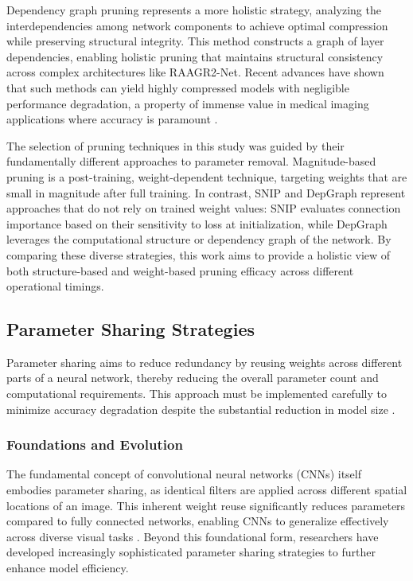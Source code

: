 \documentclass[12pt,a4paper]{article}
\begin{document}
Dependency graph pruning represents a more holistic strategy, analyzing the interdependencies among network components to achieve optimal compression while preserving structural integrity. This method constructs a graph of layer dependencies, enabling holistic pruning that maintains structural consistency across complex architectures like RAAGR2-Net. Recent advances have shown that such methods can yield highly compressed models with negligible performance degradation, a property of immense value in medical imaging applications where accuracy is paramount \cite{Mazurek2024, Ragab2024}.

The selection of pruning techniques in this study was guided by their fundamentally different approaches to parameter removal. Magnitude-based pruning is a post-training, weight-dependent technique, targeting weights that are small in magnitude after full training. In contrast, SNIP and DepGraph represent approaches that do not rely on trained weight values: SNIP evaluates connection importance based on their sensitivity to loss at initialization, while DepGraph leverages the computational structure or dependency graph of the network. By comparing these diverse strategies, this work aims to provide a holistic view of both structure-based and weight-based pruning efficacy across different operational timings.

\subsection{Parameter Sharing Strategies}

Parameter sharing aims to reduce redundancy by reusing weights across different parts of a neural network, thereby reducing the overall parameter count and computational requirements. This approach must be implemented carefully to minimize accuracy degradation despite the substantial reduction in model size \cite{desai2024}.

\subsubsection{Foundations and Evolution}

The fundamental concept of convolutional neural networks (CNNs) itself embodies parameter sharing, as identical filters are applied across different spatial locations of an image. This inherent weight reuse significantly reduces parameters compared to fully connected networks, enabling CNNs to generalize effectively across diverse visual tasks \cite{Krizhevsky2012ImageNet}. Beyond this foundational form, researchers have developed increasingly sophisticated parameter sharing strategies to further enhance model efficiency.
\end{document}
